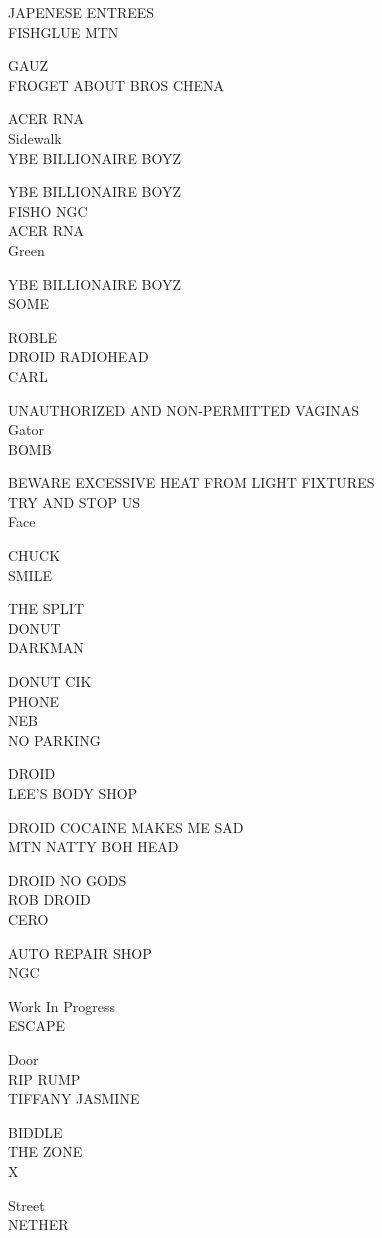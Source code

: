 \documentclass[10pt,letterpaper]{article}
\begin{document}
JAPENESE ENTREES\\
FISHGLUE MTN

GAUZ\\
FROGET ABOUT BROS CHENA

ACER RNA\\
Sidewalk\\
YBE BILLIONAIRE BOYZ

YBE BILLIONAIRE BOYZ\\
FISHO NGC\\
ACER RNA\\
Green

YBE BILLIONAIRE BOYZ\\
SOME

ROBLE\\
DROID RADIOHEAD\\
CARL

UNAUTHORIZED AND NON{-}PERMITTED VAGINAS\\
Gator\\
BOMB

BEWARE EXCESSIVE HEAT FROM LIGHT FIXTURES\\
TRY AND STOP US\\
Face

CHUCK\\
SMILE

THE SPLIT\\
DONUT\\
DARKMAN

DONUT CIK\\
PHONE\\
NEB\\
NO PARKING

DROID\\
LEE'S BODY SHOP

DROID COCAINE MAKES ME SAD\\
MTN NATTY BOH HEAD

DROID NO GODS\\
ROB DROID\\
CERO

AUTO REPAIR SHOP\\
NGC

Work In Progress\\
ESCAPE

Door\\
RIP RUMP\\
TIFFANY JASMINE

BIDDLE\\
THE ZONE\\
X

Street\\
NETHER
\end{document}

